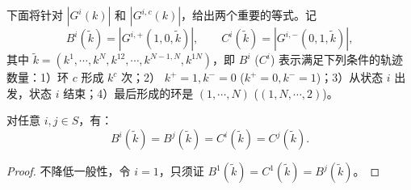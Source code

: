 \begin{appendices}
下面将针对 $|G^i(k)|$ 和 $|G^{i,c}(k)|$，给出两个重要的等式。记 
\begin{equation*}
	B^i(\tilde{k})=\left|G^{i,+}(1,0,\tilde{k})\right|,\qquad	C^i(\tilde{k})=\left|G^{i,-}(0,1,\tilde{k})\right|,
\end{equation*}
其中 $\tilde{k}=(k^1,\cdots,k^N,k^{12},\cdots,k^{N-1,N},k^{1N})$，即 $B^i$ ($C^i$) 表示满足下列条件的轨迹数量：1）环 $c$ 形成 $k^c$ 次；2） $k^+=1,k^-=0$ ($k^+=0,k^-=1$)；3）从状态 $i$ 出发，状态 $i$ 结束；4）最后形成的环是 $(1,\cdots,N)$ ($(1,N,\cdots,2)$)。

\begin{lemma}\label{lemma:BiBjCiCj}
	对任意 $i,j\in S$，有：
	\begin{equation*}
		B^i\left(\tilde{k}\right)=B^j\left(\tilde{k}\right)=C^i\left(\tilde{k}\right)=C^j\left(\tilde{k}\right).
	\end{equation*}
\end{lemma}

\begin{proof}
    不降低一般性，令 $i=1$，只须证 $B^1(\tilde{k})=C^1(\tilde{k})=B^j(\tilde{k})$。


\end{proof}
\end{appendices}
